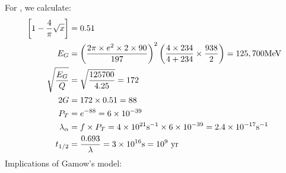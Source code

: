 \documentclass{school-22.101-notes}
\begin{document}
For , we calculate:
\begin{align}
\left[ 1 - \frac{4}{\pi} \sqrt{x} \right] &= 0.51 \\
E_G &= \left( \frac{2 \pi \times e^2 \times 2 \times 90}{197} \right)^2 \left( \frac{4 \times 234}{4 + 234} \times \frac{938}{2} \right) = 125,700 \mathrm{MeV}  \\
\sqrt{\frac{E_G}{Q}} &= \sqrt{ \frac{125700}{4.25} } = 172 \\
2 G &= 172 \times 0.51 = 88 \\
P_T &= e^{-88} = 6 \times 10^{-39} \\
\lambda_{\alpha} &= f \times P_T = 4 \times 10^{21} \mathrm{s}^{-1} \times 6 \times 10^{-39} = 2.4 \times 10^{-17} \mathrm{s}^{-1} \\
t_{1/2} &= \frac{0.693}{\lambda} = 3 \times 10^{16} \mathrm{s} = 10^9 \mbox{ yr} 
\end{align} 
Implications of Gamow's model:
\end{document}
